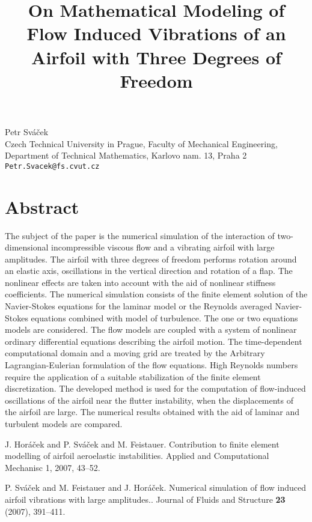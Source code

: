 \title{On Mathematical Modeling of Flow Induced Vibrations of an Airfoil with Three Degrees of Freedom}
 \author{} \institute{}
\maketitle
\begin{center}
{\large Petr Sv\' a\v cek}\\
Czech Technical University in Prague, Faculty of Mechanical Engineering, Department of Technical Mathematics, Karlovo nam. 13, Praha 2\\
{\tt Petr.Svacek@fs.cvut.cz}

\end{center}

\section*{Abstract}

The subject of the paper is the numerical simulation of the interaction of two-dimensional incompressible viscous flow and a vibrating airfoil with large amplitudes. The airfoil with
three degrees of freedom performs rotation around an elastic axis, oscillations in the vertical direction and rotation of a flap.
The nonlinear effects are taken into account with the aid of nonlinear stiffness coefficients. The numerical simulation consists of the finite element solution of the Navier-Stokes equations for the laminar model or the Reynolds averaged Navier-Stokes equations combined with model of turbulence. The one or two equations models are considered. The flow models are coupled with a system of nonlinear ordinary differential equations describing the airfoil motion. The time-dependent computational domain and a moving grid are treated by the Arbitrary Lagrangian-Eulerian formulation of the flow equations. High Reynolds numbers require the
application of a suitable stabilization of the finite element discretization. The developed method is used for the computation of flow-induced oscillations of the airfoil near the flutter instability, when the displacements of the airfoil are large. The numerical results obtained with the aid of  laminar and turbulent models are compared. 


\begin{thebibliography}{10}

{\sc J. Hor\' a\v cek and P. Sv\' a\v cek and M. Feistauer}. {Contribution to finite element modelling of airfoil aeroelastic instabilities}. Applied and Computational Mechanisc 1, 2007,  43--52.



{\sc P. Sv\' a\v cek and M. Feistauer and J. Hor\' a\v cek}. {Numerical   simulation of flow induced airfoil vibrations with large amplitudes.}. Journal of Fluids and Structure \textbf{23} (2007), 391--411.

\end{thebibliography}
